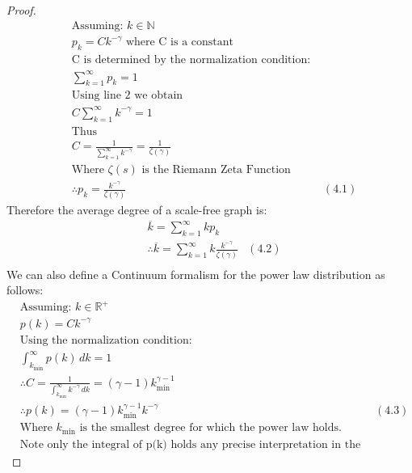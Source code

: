 \documentclass{article}
\begin{document}
        \begin{proof}
            \begin{align*}
                &\text{Assuming: } k\in \mathbb{N}\\
                &p_{k} = Ck^{-\gamma} \text{ where C is a constant}\\
                &\text{C is determined by the normalization condition: }\\
                &\sum_{k = 1}^{\infty}p_{k} = 1\\
                &\text{Using line 2 we obtain}\\
                &C\sum_{k=1}^{\infty}k^{-\gamma} = 1\\
                &\text{Thus}\\
                &C = \frac{1}{\sum_{k=1}^{\infty}k^{-\gamma}} = \frac{1}{\zeta(\gamma)}\\
                &\text{Where $\zeta(s)$ is the Riemann Zeta Function}\\
                &\therefore p_{k}=\frac{k^{-\gamma}}{\zeta(\gamma)} &(4.1)
            \end{align*}
            Therefore the average degree of a scale-free graph is:
            \begin{align*}
                &\overline{k} = \sum_{k=1}^{\infty}kp_{k}\\
                &\therefore \overline{k} = \sum_{k=1}^{\infty}k\frac{k^{-\gamma}}{\zeta(\gamma)} &(4.2)\\
            \end{align*}
            We can also define a Continuum formalism for the power law distribution as follows:
            \begin{align*}
                &\text{Assuming: } k\in \mathbb{R}^{+}\\
                &p(k) = Ck^{-\gamma}\\
                &\text{Using the normalization condition:}\\
                &\int_{k_{\text{min}}}^{\infty}p(k) \,dk = 1\\
                &\therefore C = \frac{1}{\int_{k_{\text{min}}}^{\infty}k^{-\gamma} \,dk} = (\gamma -1)k_{\text{min}}^{\gamma-1}\\
                &\therefore p(k) = (\gamma -1)k_{\text{min}}^{\gamma-1}k^{-\gamma}  &(4.3)\\
                &\text{Where $k_{\text{min}}$ is the smallest degree for which the power law holds.}\\
                &\text{Note only the integral of p(k) holds any precise interpretation in the continuum formalism}
            \end{align*}
        \end{proof}
\end{document}
